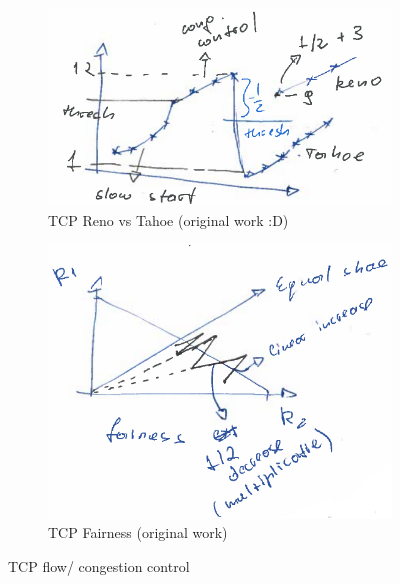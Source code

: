 \documentclass{article}
\begin{document}
\begin{figure}
    \centering
    \begin{subfigure}{0.49\textwidth}
        \centering
        \includegraphics[width=1\textwidth]{figures/tahoe_reno.png}
        \caption{TCP Reno vs Tahoe (original work :D)}
        \label{fig:tahoe_reno}
    \end{subfigure}
    \begin{subfigure}{0.49\textwidth}
        \raggedright
        \includegraphics[width=1\textwidth]{figures/fairness.png}
        \caption{TCP Fairness (original work)}
        \label{fig:fairness}
    \end{subfigure}
    \caption{TCP flow/ congestion control}
    \label{fig:tcp_fairness_congestion}
\end{figure}
\end{document}
